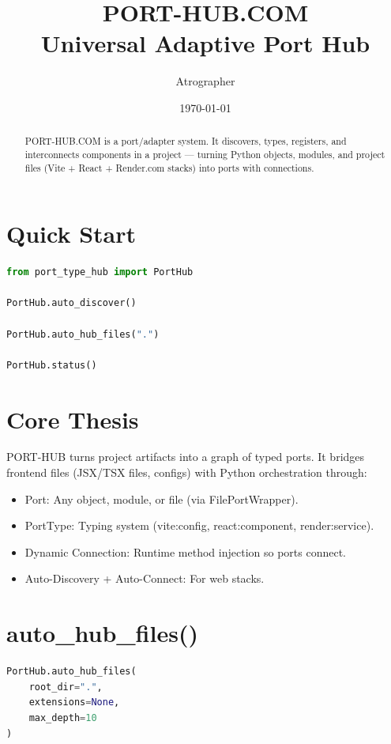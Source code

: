 \documentclass[11pt,a4paper]{article}
\title{\textbf{PORT-HUB.COM} \\ Universal Adaptive Port Hub}
\author{Atrographer}
\date{\today}
\begin{document}
\maketitle

\tableofcontents

\begin{abstract}
PORT-HUB.COM is a port/adapter system. It discovers, types, registers, and interconnects components in a project — turning Python objects, modules, and project files (Vite + React + Render.com stacks) into ports with connections.
\end{abstract}

\section{Quick Start}

\begin{lstlisting}[language=Python]
from port_type_hub import PortHub

PortHub.auto_discover()

PortHub.auto_hub_files(".")

PortHub.status()
\end{lstlisting}

\section{Core Thesis}

PORT-HUB turns project artifacts into a graph of typed ports. It bridges frontend files (JSX/TSX files, configs) with Python orchestration through:

\begin{itemize}
    \item Port: Any object, module, or file (via FilePortWrapper).
    \item PortType: Typing system (vite:config, react:component, render:service).
    \item Dynamic Connection: Runtime method injection so ports connect.
    \item Auto-Discovery + Auto-Connect: For web stacks.
\end{itemize}

\section{auto\_hub\_files()}

\begin{lstlisting}[language=Python]
PortHub.auto_hub_files(
    root_dir=".",
    extensions=None,
    max_depth=10
)
\end{lstlisting}
\end{document}
